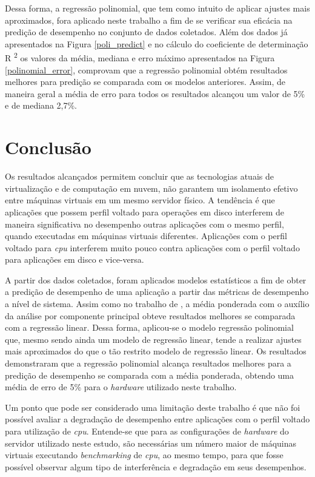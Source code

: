 \documentclass[[10pt,journal]{IEEEtran}
\begin{document}
Dessa forma, a regressão polinomial, que tem como intuito de aplicar ajustes mais aproximados, fora aplicado neste trabalho a fim de se verificar sua eficácia na predição de desempenho no conjunto de dados coletados. Além dos dados já apresentados na Figura \ref{poli_predict} e no cálculo do coeficiente de determinação R \textsuperscript{2} os valores da média, mediana e erro máximo apresentados na Figura \ref{polinomial_error}, comprovam que a regressão polinomial obtém resultados melhores para predição se comparada com os modelos anteriores. Assim, de maneira geral a média de erro para todos os resultados alcançou um valor de 5\% e de mediana 2,7\%. 

\section{Conclusão}

Os resultados alcançados permitem concluir que as tecnologias atuais de virtualização e de computação em nuvem, não garantem um isolamento efetivo entre máquinas virtuais em um mesmo servidor físico. A tendência é que aplicações que possem perfil voltado para operações em disco interferem de maneira significativa no desempenho outras aplicações  com o mesmo perfil, quando executadas em máquinas virtuais diferentes. Aplicações com o perfil voltado para \textit{cpu} interferem muito pouco contra aplicações com o perfil voltado para aplicações em disco e vice-versa.

A partir dos dados coletados, foram aplicados modelos estatísticos a fim de obter a predição de desempenho de uma aplicação a partir das métricas de desempenho a nível de sistema. Assim como no trabalho de \cite{koh2007}, a média ponderada com o auxílio da análise por componente principal obteve resultados melhores se comparada com a regressão linear. Dessa forma, aplicou-se o modelo regressão polinomial que, mesmo sendo ainda um modelo de regressão linear, tende a realizar ajustes mais aproximados do que o tão restrito modelo de regressão linear. Os resultados demonstraram que a regressão polinomial alcança resultados melhores para a predição de desempenho se comparada com a média ponderada, obtendo uma média de erro de 5\% para o \textit{hardware} utilizado neste trabalho.

Um ponto que pode ser considerado uma limitação deste trabalho é que não foi possível avaliar a degradação de desempenho entre aplicações com o perfil voltado para utilização de \textit{cpu}. Entende-se que para as configurações de \textit{hardware} do servidor utilizado neste estudo, são necessárias um número maior de máquinas virtuais executando \textit{benchmarking} de \textit{cpu}, ao mesmo tempo, para que fosse possível observar algum tipo de interferência e degradação em seus desempenhos.
\end{document}
